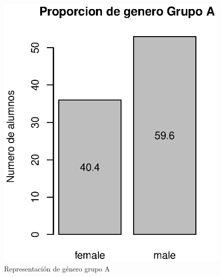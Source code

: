 \documentclass{article}
\begin{document}
    \begin{figure}[H]
        \begin{minipage}[b]{0.45\linewidth}
            \includegraphics[scale = 0.8]{Output/Plots/figure21.eps}
            \vspace*{-8.5mm}
            \caption{Representaci\'on de g\'enero grupo A}
            \label{fig:minipage1}
        \end{minipage}
        \hspace{0.2cm}
        \begin{minipage}[b]{0.45\linewidth}

\end{minipage}
\end{figure}
\end{document}
